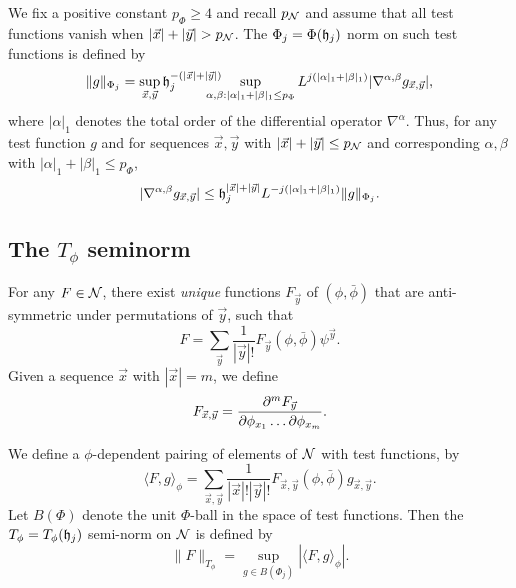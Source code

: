 We fix a positive constant $p_\Phi\ge 4$ and recall $p_{\mathcal{N}}$
and assume that all test functions
vanish when $|\vec x|  +|\vec y| > p_{\mathcal{N}}$.
The $\Phi_j = \Phi(\mathfrak{h}_j)$ norm on such test functions is defined by
\begin{equation}
\|g\|_{\Phi_j}
	=
\sup_{\vec x, \vec y} \h_j^{-(|\vec x| +|\vec y|)}
	\shift\shift
\sup_{\alpha,\beta: |\alpha|_1+|\beta|_1 \le p_\Phi}
L^{j (|\alpha|_1 + |\beta|_1)}
|\nabla^{\alpha,\beta} g_{\vec x, \vec y}|,
\end{equation}
where $|\alpha|_1$ denotes the total order of the differential operator $\nabla^\alpha$.
Thus, for any test function $g$ and for sequences
$\vec x, \vec y$ with $|\vec x| +|\vec y| \leq p_{\mathcal{N}}$ and
corresponding $\alpha, \beta$ with $|\alpha|_1 + |\beta|_1 \leq p_\Phi$,
\begin{equation}
\label{e:testfcnbd}
|\nabla^{\alpha,\beta} g_{\vec x,\vec y}|
	\leq
\mathfrak{h}_j^{|\vec x| + |\vec y|} L^{-j (|\alpha|_1 + |\beta|_1)} \|g\|_{\Phi_j}.
\end{equation}

\subsection{The \texorpdfstring{$T_\phi$}{Tphi} seminorm}

For any $F \in \mathcal{N}$,
there exist \emph{unique} functions $F_{\vec y}$ of $(\phi, \bar\phi)$
that are anti-symmetric under permutations of $\vec y$, such that
\begin{equation}
F = \sum_{\vec y} \frac{1}{|\vec y|!} F_{\vec y}(\phi, \bar\phi) \psi^{\vec y}.
\end{equation}
Given a sequence $\vec{x}$ with $|\vec{x}| = m$, we define
\begin{equation}
F_{\vec x, \vec y} = \frac{\partial ^m F_{\vec y}}{\partial \phi_{x_1} \ldots \partial\phi_{x_m}}.
\end{equation}

We define a $\phi$-dependent pairing of elements of $\mathcal{N}$ with test functions, by
\begin{equation}
\langle F, g \rangle_\phi
  =
\sum_{\vec x, \vec y}
\frac{1}{|\vec x|! |\vec y|!}
F_{\vec x,\vec y}(\phi, \bar\phi)
g_{\vec x,\vec y}.
\end{equation}
Let $B(\Phi)$ denote the unit $\Phi$-ball in the space of test functions. Then the
$T_\phi = T_\phi(\mathfrak{h}_j)$ semi-norm on $\mathcal{N}$ is defined by
\begin{equation}
\|F\|_{T_\phi} = \sup_{g\in B(\Phi_j)} |\langle F, g \rangle_\phi|.
\end{equation}

